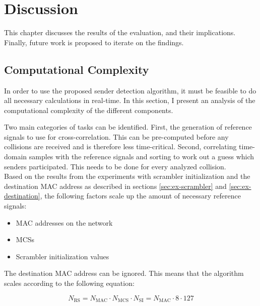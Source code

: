 
\chapter{Discussion}\label{ch:Discussion}
\glsresetall %

This chapter discusses the results of the evaluation, and their implications. Finally, future work is proposed to iterate on the findings.



\section{Computational Complexity}\label{sec:complexity}

In order to use the proposed sender detection algorithm, it must be feasible to do all necessary calculations in real-time. In this section, I present an analysis of the computational complexity of the different components.

Two main categories of tasks can be identified. First, the generation of reference signals to use for cross-correlation. This can be pre-computed before any collisions are received and is therefore less time-critical. Second, correlating time-domain samples with the reference signals and sorting to work out a guess which senders participated. This needs to be done for every analyzed collision.\\

Based on the results from the experiments with scrambler initialization and the destination \gls{MAC} address as described in sections \ref{sec:ex-scrambler} and \ref{sec:ex-destination}, the following factors scale up the amount of necessary reference signals:

\begin{itemize}
  \item \gls{MAC} addresses on the network
  \item \glspl{MCS}
  \item Scrambler initialization values
\end{itemize}

The destination \gls{MAC} address can be ignored. This means that the algorithm scales according to the following equation:

$$ N_{\text{RS}} = N_{\text{MAC}} \cdot N_{\text{MCS}} \cdot N_{\text{SI}} = N_{\text{MAC}} \cdot 8 \cdot 127 $$\vspace{0cm}

